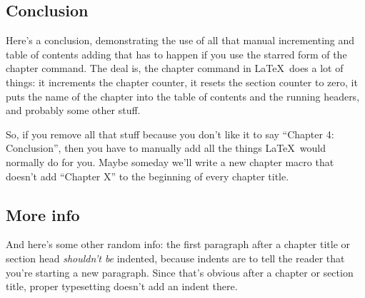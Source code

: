 \documentclass[12pt,twoside]{reedfancy}
\begin{document}
\begin{spacing}{1.25}
\chapter{Conclusion}
\label{concl}
	
Here's a conclusion, demonstrating the use of all that manual incrementing and table of contents adding that has to happen if you use the starred form of the chapter command. The deal is, the chapter command in \LaTeX\ does a lot of things: it increments the chapter counter, it resets the section counter to zero, it puts the name of the chapter into the table of contents and the running headers, and probably some other stuff. 

So, if you remove all that stuff because you don't like it to say ``Chapter 4: Conclusion'', then you have to manually add all the things \LaTeX\ would normally do for you. Maybe someday we'll write a new chapter macro that doesn't add ``Chapter X'' to the beginning of every chapter title.

\section{More info}
And here's some other random info: the first paragraph after a chapter title or section head \emph{shouldn't be} indented, because indents are to tell the reader that you're starting a new paragraph. Since that's obvious after a chapter or section title, proper typesetting doesn't add an indent there. 





  \backmatter %

%  

    

\end{spacing}
\end{document}
